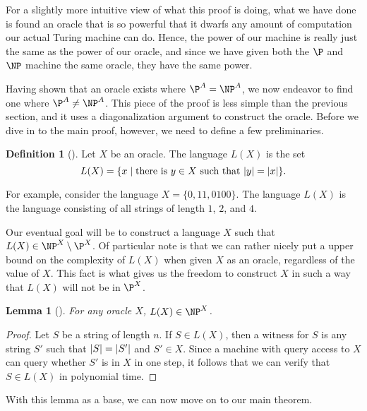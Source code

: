 \documentclass[english,12pt]{reedthesis}
\theoremstyle{plain}
\newtheorem{lemma}[lemma]{Lemma}
\theoremstyle{definition}
\newtheorem{defn}[defn]{Definition}
\theoremstyle{remark}
\DeclarePairedDelimiter{\abs}{\lvert}{\rvert}
\begin{document}
For a slightly more intuitive view of what this proof is doing, what we have
done is found an oracle that is so powerful that it dwarfs any amount of
computation our actual Turing machine can do. Hence, the power of our machine is
really just the same as the power of our oracle, and since we have given both
the $\P$ and $\NP$ machine the same oracle, they have the same power.

Having shown that an oracle exists where $\P^{A} = \NP^{A}$, we now endeavor to
find one where $\P^{A} \ne \NP^{A}$. This piece of the proof is less simple than
the previous section, and it uses a diagonalization argument to construct the
oracle. Before we dive in to the main proof, however, we need to define a few
preliminaries.

\begin{defn}[{\cite[436]{BGS75}}]\label{def:l(x)}
  Let $X$ be an oracle. The language $L(X)$ is the set
  \begin{equation*}
    L(X) = \{x \mid \text{there is } y \in X \text{ such that } \abs{y} = \abs{x}\}.
  \end{equation*}
\end{defn}

For example, consider the language $X = \{0, 11, 0100\}$. The language $L(X)$ is
the language consisting of all strings of length $1$, $2$, and $4$.

Our eventual goal will be to construct a language $X$ such that
$L(X) \in \NP^{X} \setminus \P^{X}$. Of particular note is that we can rather nicely put a
upper bound on the complexity of $L(X)$ when given $X$ as an oracle, regardless
of the value of $X$. This fact is what gives us the freedom to construct $X$ in
such a way that $L(X)$ will not be in $\P^{X}$.

\begin{lemma}[{\cite[436]{BGS75}}]\label{lem:l(x)-in-np}
  For any oracle $X$, $L(X) \in \NP^{X}$.
\end{lemma}

\begin{proof}
  Let $S$ be a string of length $n$. If $S \in L(X)$, then a witness for $S$ is
  any string $S'$ such that $\abs{S} = \abs{S'}$ and $S' \in X$. Since a machine
  with query access to $X$ can query whether $S'$ is in $X$ in one step, it
  follows that we can verify that $S \in L(X)$ in polynomial time.
\end{proof}

With this lemma as a base, we can now move on to our main theorem.
\end{document}
